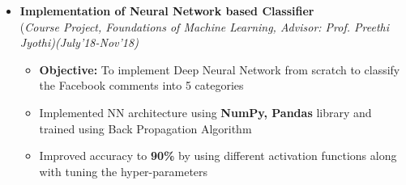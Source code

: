 \documentclass[a4paper,10pt]{article}
\begin{document}
\begin{itemize}
\item \textbf{Implementation of Neural Network based Classifier} \\ 
(\emph{Course Project, Foundations of Machine Learning, Advisor: Prof. Preethi Jyothi)\hfill (July'18-Nov’18)} \\[-0.4cm]
	\begin{itemize}[noitemsep,nolistsep]
	\item \textbf{Objective:} To implement Deep Neural Network from scratch to classify the Facebook comments into 5 categories %
    \item Implemented NN architecture using \textbf{NumPy, Pandas} library and trained using Back Propagation Algorithm
    \item Improved accuracy to \textbf{90\%} by using different activation functions along with tuning the hyper-parameters
	\end{itemize}




\end{itemize}
\end{document}
